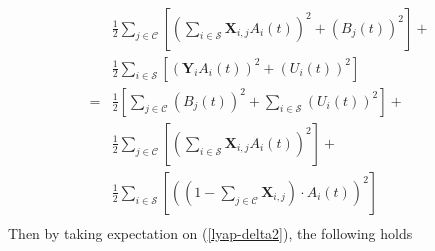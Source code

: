 \documentclass[10pt,journal,compsoc]{IEEEtran}
\begin{document}
\\
\begin{equation}\label{lyap-delta2}
	\begin{array}{cl}
		& \displaystyle \frac{1}{2} \sum_{j \in \mathcal{C}} \left[ \left( \sum_{i \in \mathcal{S}} \mathbf{X}_{i,j} A_i(t) \right)^2  + \left( B_j(t) \right)^2 \right] + \\
		& \displaystyle \frac{1}{2} \sum_{i \in \mathcal{S}} \left[ \left( \mathbf{Y}_{i} A_i(t) \right)^2  + \left( U_i(t) \right)^2 \right] \\
		= & \displaystyle \frac{1}{2} \left[ \sum_{j \in \mathcal{C}} \left( B_j(t) \right)^2 + \sum_{i \in \mathcal{S}} \left( U_i(t) \right)^2 \right] + \\
		& \displaystyle \frac{1}{2} \sum_{j \in \mathcal{C}} \left[ \left( \sum_{i \in \mathcal{S}} \mathbf{X}_{i,j} A_i(t) \right)^2 \right] +  \\
		& \displaystyle \frac{1}{2} \sum_{i \in \mathcal{S}} \left[ \left( (1 - \sum_{j \in \mathcal{C}} \mathbf{X}_{i,j}) \cdot A_i(t) \right)^2 \right] \\
	\end{array}
\end{equation}
Then by taking expectation on (\ref{lyap-delta2}), the following holds
\end{document}
